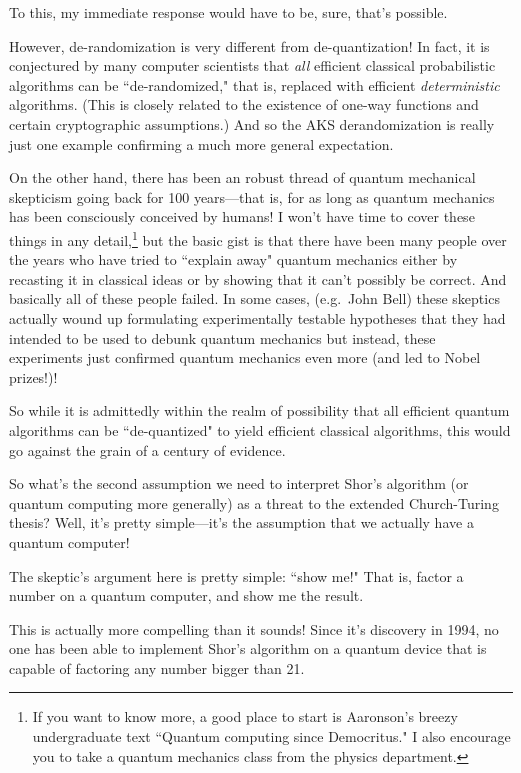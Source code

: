 \documentclass{article}
\begin{document}
To this, my immediate response would have to be, sure, that's possible.

However, de-randomization is very different from de-quantization!
In fact, it is conjectured by many computer scientists that \emph{all} efficient classical probabilistic algorithms can be ``de-randomized," that is, replaced with efficient \emph{deterministic} algorithms.  (This is closely related to the existence of one-way functions and certain cryptographic assumptions.)  And so the AKS derandomization is really just one example confirming a much more general expectation.

On the other hand, there has been an robust thread of quantum mechanical skepticism going back for 100 years---that is, for as long as quantum mechanics has been consciously conceived by humans!  I won't have time to cover these things in any detail,\footnote{If you want to know more, a good place to start is Aaronson's breezy undergraduate text ``Quantum computing since Democritus."  I also encourage you to take a quantum mechanics class from the physics department.} but the basic gist is that there have been many people over the years who have tried to ``explain away" quantum mechanics either by recasting it in classical ideas or by showing that it can't possibly be correct.  And basically all of these people failed.  In some cases, (e.g.\ John Bell) these skeptics actually wound up formulating experimentally testable hypotheses that they had intended to be used to debunk quantum mechanics but instead, these experiments just confirmed quantum mechanics even more (and led to Nobel prizes!)!  

So while it is admittedly within the realm of possibility that all efficient quantum algorithms can be ``de-quantized" to yield efficient classical algorithms, this would go against the grain of a century of evidence.

So what's the second assumption we need to interpret Shor's algorithm (or quantum computing more generally) as a threat to the extended Church-Turing thesis?  Well, it's pretty simple---it's the assumption that we actually have a quantum computer!

The skeptic's argument here is pretty simple: ``show me!"  That is, factor a number on a quantum computer, and show me the result.

This is actually more compelling than it sounds!  Since it's discovery in 1994, no one has been able to implement Shor's algorithm on a quantum device that is capable of factoring any number bigger than 21.
\end{document}
